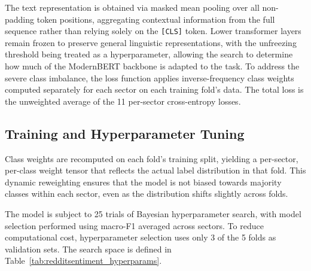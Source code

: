 The text representation is obtained via masked mean pooling over all non-padding token positions, aggregating contextual information from the full sequence rather than relying solely on the \texttt{[CLS]} token. Lower transformer layers remain frozen to preserve general linguistic representations, with the unfreezing threshold being treated as a hyperparameter, allowing the search to determine how much of the ModernBERT backbone is adapted to the task. To address the severe class imbalance, the loss function applies inverse-frequency class weights computed separately for each sector on each training fold's data. The total loss is the unweighted average of the 11 per-sector cross-entropy losses.

\subsection{Training and Hyperparameter Tuning}
\label{sec:reddithyperparams}

Class weights are recomputed on each fold's training split, yielding a per-sector, per-class weight tensor that reflects the actual label distribution in that fold. This dynamic reweighting ensures that the model is not biased towards majority classes within each sector, even as the distribution shifts slightly across folds.

The model is subject to 25 trials of Bayesian hyperparameter search, with model selection performed using macro-F1 averaged across sectors. To reduce computational cost, hyperparameter selection uses only 3 of the 5 folds as validation sets. The search space is defined in Table~\ref{tab:redditsentiment_hyperparams}.

